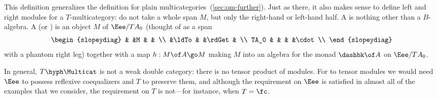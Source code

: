 This definition generalizes the definition for plain
multicategories~(\ref{sec:om-further}).  Just as there, it also makes sense
to define left and right modules for a $T$-multicategory: do not take a
whole span $M$, but only the right-hand or left-hand half.  A  is nothing other than a $B$-algebra.  A 
(or )%
%
%
is an object $M$ of $\Eee/TA_0$ (thought of as a
span
\[
\begin{slopeydiag}
	&	&M	&	&	\\
	&\ldTo	&	&\rdGet	&	\\
TA_0	&	&	&	&\cdot	\\
\end{slopeydiag}
\]
with a phantom right leg) together with a map $h: M\of A \go M$ making $M$
into an algebra for the monad $\dashbk\of A$ on $\Eee/TA_0$.  

In general, $T\hyph\Multicat$ is not a weak double category: there is no
tensor%
%
%
product of modules.  For to tensor modules we would need $\Eee$ to
possess reflexive coequalizers and $T$ to preserve them, and although the
requirement on $\Eee$ is satisfied in almost all of the examples that we
consider, the requirement on $T$ is not---for instance, when $T=\fc$.


